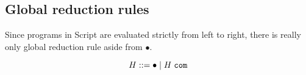 \documentclass{article}
\begin{document}
\subsection{Global reduction rules}

Since programs in Script are evaluated strictly from left to right, there is really only global reduction rule aside from $\bullet$.

$$H ::= \bullet \mid H \hspace{1mm} \texttt{com}$$
\end{document}
